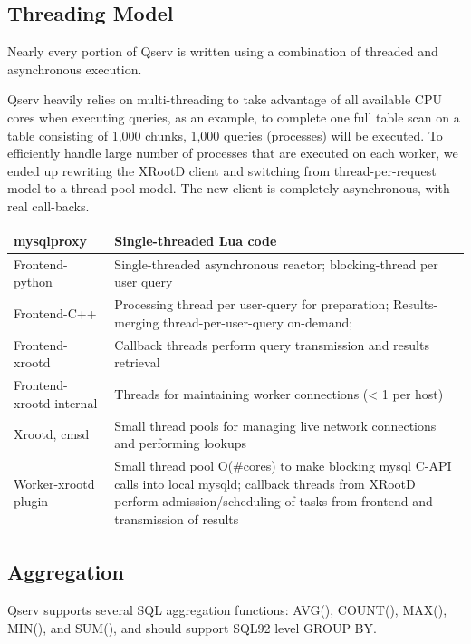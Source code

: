 \documentclass[DM,lsstdraft,toc]{lsstdoc}
\begin{document}
\subsection{Threading Model}\label{threading-model}

Nearly every portion of Qserv is written using a combination of threaded
and asynchronous execution.

Qserv heavily relies on multi-threading to take advantage of all
available CPU cores when executing queries, as an example, to complete
one full table scan on a table consisting of 1,000 chunks, 1,000 queries
(processes) will be executed. To efficiently handle large number of
processes that are executed on each worker, we ended up rewriting the
XRootD client and switching from
thread-per-request model to a thread-pool model. The new client is
completely asynchronous, with real call-backs.

\begin{longtable}{|l|p{}|}
\hline
mysqlproxy & Single-threaded Lua code \\ \hline
Frontend-python & Single-threaded asynchronous reactor; blocking-thread per user
query \\ \hline
Frontend-C++ & Processing thread per user-query for preparation; Results-merging
thread-per-user-query on-demand; \\ \hline
Frontend-xrootd &
Callback threads perform query transmission and results retrieval \\ \hline
Frontend-xrootd internal &
Threads for maintaining worker connections (\textless{} 1 per
host) \\ \hline
Xrootd, cmsd &
Small thread pools for managing live network connections and performing
lookups \\ \hline
Worker-xrootd plugin &
Small thread pool O(\#cores) to make blocking mysql C-API calls into
local mysqld; callback threads from XRootD
perform admission/scheduling of tasks from frontend and transmission of
results \\ \hline
\hline
\end{longtable}

\subsection{Aggregation}\label{aggregation}

Qserv supports several SQL aggregation functions: AVG(), COUNT(), MAX(),
MIN(), and SUM(), and should support SQL92 level GROUP BY.
\end{document}
